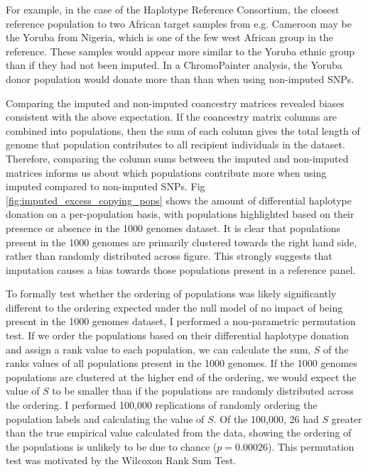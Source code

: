 For example, in the case of the Haplotype Reference Consortium, the closest reference population to two African target samples from e.g. Cameroon may be the Yoruba from Nigeria, which is one of the few west African group in the reference. These samples would appear more similar to the Yoruba ethnic group than if they had not been imputed. In a ChromoPainter analysis, the Yoruba donor population would donate more than than when using non-imputed SNPs.    

Comparing the imputed and non-imputed coancestry matrices revealed biases consistent with the above expectation. If the coancestry matrix columns are combined into populations, then the sum of each column gives the total length of genome that population contributes to all recipient individuals in the dataset. Therefore, comparing the column sums between the imputed and non-imputed matrices informs us about which populations contribute more when using imputed compared to non-imputed SNPs. Fig \ref{fig:imputed_excess_copying_pops} shows the amount of differential haplotype donation on a per-population basis, with populations highlighted based on their presence or absence in the 1000 genomes dataset. It is clear that populations present in the 1000 genomes are primarily clustered towards the right hand side, rather than randomly distributed across figure. This strongly suggests that imputation causes a bias towards those populations present in a reference panel. 

To formally test whether the ordering of populations was likely significantly different to the ordering expected under the null model of no impact of being present in the 1000 genomes dataset, I performed a non-parametric permutation test. If we order the populations based on their differential haplotype donation and assign a rank value to each population, we can calculate the sum, $S$ of the ranks values of all populations present in the 1000 genomes. If the 1000 genomes populations are clustered at the higher end of the ordering, we would expect the value of $S$ to be smaller than if the populations are randomly distributed across the ordering. I performed 100,000 replications of randomly ordering the population labels and calculating the value of $S$. Of the 100,000, 26 had $S$ greater than the true empirical value calculated from the data, showing the ordering of the populations is unlikely to be due to chance ($p=0.00026$). This permutation test was motivated by the Wilcoxon Rank Sum Test.  


